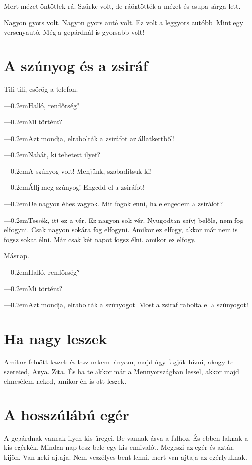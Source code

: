 \documentclass[12pt]{memoir}
\def\dash{---\kern 0.2em}
\begin{document}
Mert mézet öntöttek rá. Szürke volt, de ráöntötték a mézet és csupa sárga lett.

Nagyon gyors volt. Nagyon gyors autó volt. Ez volt a leggyors autóbb. Mint egy
versenyautó. Még a gepárdnál is gyorsabb volt!


\section{A szúnyog és a zsiráf}
Tili-tili, csörög a telefon.

\dash Halló, rendőrség?

\dash Mi történt?

\dash Azt mondja, elrabolták a zsiráfot az állatkertből!

\dash Nahát, ki tehetett ilyet?

\dash A szúnyog volt! Menjünk, szabadítsuk ki!

\dash Állj meg szúnyog! Engedd el a zsiráfot!

\dash De nagyon éhes vagyok. Mit fogok enni, ha elengedem a zsiráfot?

\dash Tessék, itt ez a vér. Ez nagyon sok vér. Nyugodtan szívj belőle, nem fog
elfogyni. Csak nagyon sokára fog elfogyni. Amikor ez elfogy, akkor már nem is
fogsz sokat élni. Már csak két napot fogsz élni, amikor ez elfogy.

\bigskip

Másnap.

\dash Halló, rendőrség?

\dash Mi történt?

\dash Azt mondja, elrabolták a szúnyogot. Most a zsiráf rabolta el a szúnyogot!


\section{Ha nagy leszek}
Amikor felnőtt leszek és lesz nekem lányom, majd úgy fogják hívni, ahogy te
szereted, Anya. Zita. És ha te akkor már a Mennyországban leszel, akkor majd
elmesélem neked, amikor én is ott leszek.


\section{A hosszúlábú egér}
A gepárdnak vannak ilyen kis üregei. Be vannak ásva a falhoz. És ebben laknak a
kis egérkék. Minden nap tesz bele egy kis ennivalót. Megeszi az egér és aztán
kijön. Van neki ajtaja. Nem veszélyes bent lenni, mert van ajtaja az
egérlyuknak.
\end{document}
